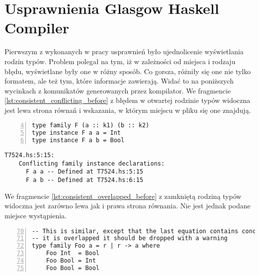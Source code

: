 \chapter{Usprawnienia Glasgow Haskell Compiler}\label{chap:badania}

\label{sec:zgloszenie_10839}

Pierwszym z wykonanych w pracy usprawnień było ujednolicenie wyświetlania rodzin
typów. Problem polegał na tym, iż w zależności od miejsca i rodzaju błędu,
wyświetlane były one w różny sposób. Co gorsza, różniły się one nie tylko
formatem, ale też tym, które informacje zawierają. Widać to na poniższych
wycinkach z komunikatów generowanych przez kompilator. We fragmencie
\ref{lst:consistent_conflicting_before} z błędem w otwartej rodzinie typów
widoczna jest lewa strona równań i wskazania, w którym miejscu w pliku się one
znajdują.

\begin{lstlisting}[float,numbers=left,firstnumber=4,label={lst:consistent_conflicting_code},
                   caption={Fragment testu T7524 z dwoma równaniami otwartej rodziny typów będącymi w konflikcie.}]
type family F (a :: k1) (b :: k2)
type instance F a a = Int
type instance F a b = Bool
\end{lstlisting}

\begin{lstlisting}[float,language={},label={lst:consistent_conflicting_before},
                   caption={Błąd generowany przez kompilator w przypadku \ref{lst:consistent_conflicting_code} przed wprowadzeniem zmian.}]
T7524.hs:5:15:
    Conflicting family instance declarations:
      F a a -- Defined at T7524.hs:5:15
      F a b -- Defined at T7524.hs:6:15
\end{lstlisting}

We fragmencie \ref{lst:consistent_overlapped_before} z zamkniętą rodziną typów widoczna jest zarówno lewa jak i prawa strona równania. Nie jest jednak podane miejsce wystąpienia.

\begin{lstlisting}[float,numbers=left,firstnumber=70,label={lst:consistent_overlapped_code},
                   caption={Fragment testu T6018 z zamkniętą rodziną typów z równaniami o nachodzących na siebie dziedzinach.}]
-- This is similar, except that the last equation contains concrete type.  Since
-- it is overlapped it should be dropped with a warning
type family Foo a = r | r -> a where
    Foo Int  = Bool
    Foo Bool = Int
    Foo Bool = Bool
\end{lstlisting}

